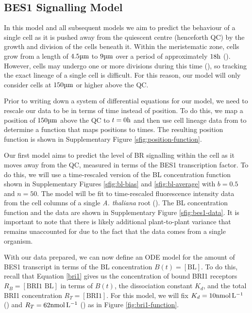 \subsection{BES1 Signalling Model} \label{bes1-model-section}

In this model and all subsequent models we aim to predict the behaviour of a single cell as it is pushed away from the quiescent centre (henceforth QC) by the growth and division of the cells beneath it. Within the meristematic zone, cells grow from a length of $4.5\um$ to $9\um$ over a period of approximately $18\h$ (\cite{verbelen2006}). However, cells may undergo one or more divisions during this time (\cite{goh2023}), so tracking the exact lineage of a single cell is difficult. For this reason, our model will only consider cells at $150\um$ or higher above the QC. 

\medskip

Prior to writing down a system of differential equations for our model, we need to rescale our data to be in terms of time instead of position. To do this, we map a position of $150\um$ above the QC to $t = 0\h$ and then use cell lineage data from \cite{goh2023} to determine a function that maps positions to times. The resulting position function is shown in Supplementary Figure \ref{sfig:position-function}.

\medskip

Our first model aims to predict the level of BR signalling within the cell as it moves away from the QC, measured in terms of the BES1 transcription factor. To do this, we will use a time-rescaled version of the BL concentration function shown in Supplementary Figures \ref{sfig:bl-bias} and \ref{sfig:bl-average} with $b = 0.5$ and $n = 50$. The model will be fit to time-rescaled fluorescence intensity data from the cell columns of a single \emph{A. thaliana} root (\cite{vukasinovic2021}). The BL concentration function and the data are shown in Supplementary Figure \ref{sfig:bes1-data}. It is important to note that there is likely additional plant-to-plant variance that remains unaccounted for due to the fact that the data comes from a single organism. 

\medskip

With our data prepared, we can now define an ODE model for the amount of BES1 transcript in terms of the BL concentration $B(t) = [\text{BL}]$. To do this, recall that Equation \eqref{bri1} gives us the concentration of bound BRI1 receptors $R_{B} = [\text{BRI1 BL}]$ in terms of $B(t)$, the dissociation constant $K_{d}$, and the total BRI1 concentration $R_{T} = [\text{BRI1}]$. For this model, we will fix $K_{d} = 10\nm$ (\cite{wang2001}) and $R_{T} = 62\nm$ (\cite{vanesse2012}) as in Figure \ref{fig:bri1-function}.

